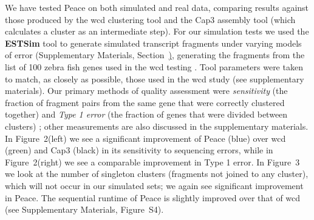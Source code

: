 \documentclass[a4,center,fleqn]{NAR}
\begin{document}
We have tested {\sc Peace} on both simulated and real data,
comparing results against those produced by the {\sc wcd}
clustering tool \cite{Hazelhurst08a} and the {\sc Cap3} assembly
tool \cite{Huang99} (which calculates a cluster as an intermediate
step).  For our simulation tests we used the {\bf ESTSim} tool
\cite{Hazelhurst03} to generate simulated transcript fragments under varying models
of error (Supplementary Materials, Section~\href{ESTsim_sup}),
generating the fragments from the list of 100 zebra fish genes used in
the {\sc wcd} testing \cite{Hazelhurst08a}.  Tool parameters were
taken to match, as closely as possible, those used in the {\sc wcd}
study (see supplementary materials).  Our primary methods of quality
assessment were {\it sensitivity} (the fraction of fragment pairs from the
same gene that were correctly clustered together) and {\it Type 1
  error} (the fraction of genes that were divided between clusters)
\cite{Wang04,Hazelhurst08a}; other measurements are also discussed
in the supplementary materials.  In Figure~2(left) we see a
significant improvement of {\sc Peace} (blue) over {\sc wcd}
(green) and {\sc Cap3} (black) in its sensitivity to sequencing
errors, while in Figure~2(right) we see a comparable
improvement in Type 1 error.  In Figure~3 we look at
the number of singleton clusters (fragments not joined to any cluster),
which will not occur in our simulated sets; we again see significant
improvement in {\sc Peace}.  The sequential runtime of
{\sc Peace} is slightly improved over that of {\sc wcd} (see
Supplementary Materials, Figure~S4).
\end{document}
